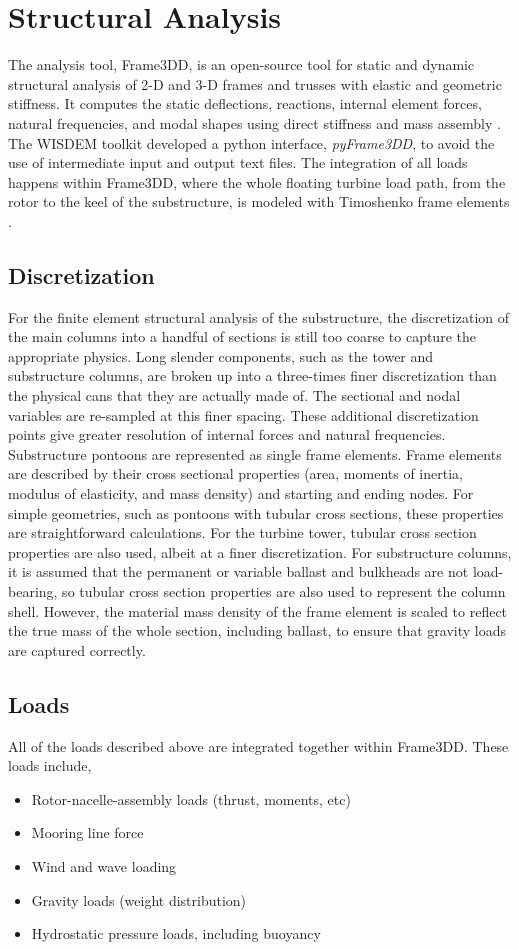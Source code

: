 \section{Structural Analysis}
The analysis tool, Frame3DD, is an open-source tool for static and
dynamic structural analysis of 2-D and 3-D frames and trusses with
elastic and geometric stiffness. It computes the static deflections,
reactions, internal element forces, natural frequencies, and modal
shapes using direct stiffness and mass assembly \citep{frame3dd}.  The
WISDEM toolkit developed a python interface, \textit{pyFrame3DD}, to
avoid the use of intermediate input and output text files.  The
integration of all loads happens within Frame3DD, where the whole floating
turbine load path, from the rotor to the keel of the substructure, is
modeled with Timoshenko frame elements \citep{timoshenko}.

\subsection{Discretization}
For the finite element structural analysis of the substructure, the
discretization of the main columns into a handful of sections is still
too coarse to capture the appropriate physics. Long slender components,
such as the tower and substructure columns, are broken up into a
three-times finer discretization than the physical cans that they are
actually made of.  The sectional and nodal variables are re-sampled at
this finer spacing.  These additional discretization points give greater
resolution of internal forces and natural frequencies.  Substructure
pontoons are represented as single frame elements.  Frame elements are
described by their cross sectional properties (area, moments of inertia,
modulus of elasticity, and mass density) and starting and ending nodes.
For simple geometries, such as pontoons with tubular cross sections,
these properties are straightforward calculations.  For the turbine
tower, tubular cross section properties are also used, albeit at a finer
discretization.  For substructure columns, it is assumed that the
permanent or variable ballast and bulkheads are not load-bearing, so
tubular cross section properties are also used to represent the column
shell.  However, the material mass density of the frame element is
scaled to reflect the true mass of the whole section, including ballast,
to ensure that gravity loads are captured correctly.

\subsection{Loads}
All of the loads described above are integrated together within
Frame3DD.  These loads include,
\begin{itemize}
\item Rotor-nacelle-assembly loads (thrust, moments, etc)
\item Mooring line force
\item Wind and wave loading
\item Gravity loads (weight distribution)
\item Hydrostatic pressure loads, including buoyancy
\end{itemize}

